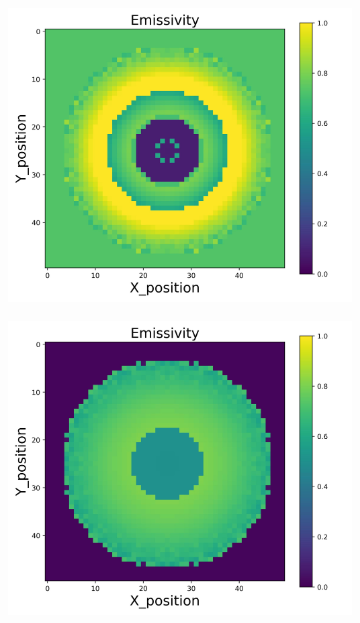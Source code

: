 \begin{figure}[p]
\begin{minipage}{\textwidth}
\begin{subfigure}{0.325\textwidth}
        \end{subfigure}
    \end{minipage}\\
    \begin{minipage}{\textwidth}
        \centering
        \begin{subfigure}{0.325\textwidth}
            \centering
            \includegraphics[width=\textwidth]{figures/raw_data/25/linear/emi_cal.jpg}
        \end{subfigure}
        \begin{subfigure}{0.325\textwidth}
            \centering
            \includegraphics[width=\textwidth]{figures/raw_data/26/linear/emi_cal.jpg}

\end{subfigure}
\end{minipage}
\end{figure}
